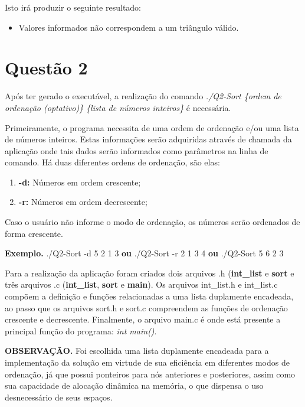  Isto irá produzir o seguinte resultado:

  \begin{itemize}
    \item Valores informados não correspondem a um triângulo válido.
  \end{itemize}

\section{Questão 2}

  Após ter gerado o executável, a realização do comando \textit{./Q2-Sort \{ordem de ordenação (optativo)\} \{lista de números
  inteiros\}} é necessária.

  Primeiramente, o programa necessita de uma ordem de ordenação e/ou uma lista de números inteiros. Estas informações
  serão adquiridas através de chamada da aplicação onde tais dados serão informados como parâmetros na linha de comando.
  Há duas diferentes ordens de ordenação, são elas:

  \begin{enumerate}
    \item \textbf{-d:} Números em ordem crescente;
    \item \textbf{-r:} Números em ordem decrescente;
  \end{enumerate}

  Caso o usuário não informe o modo de ordenação, os números serão ordenados de forma crescente.

  \textbf{Exemplo.} ./Q2-Sort -d 5 2 1 3 \textbf{ou} ./Q2-Sort -r 2 1 3 4 \textbf{ou} ./Q2-Sort 5 6 2 3

  Para a realização da aplicação foram criados dois arquivos .h (\textbf{int\_list} e \textbf{sort} e três arquivos .c
  (\textbf{int\_list}, \textbf{sort} e \textbf{main}). Os arquivos int\_list.h e int\_list.c compõem a definição e
  funções relacionadas a uma lista duplamente encadeada, ao passo que os arquivos sort.h e sort.c compreendem as funções
  de ordenação crescente e decrescente. Finalmente, o arquivo main.c é onde está presente a principal função do
  programa: \textit{int main()}.

  \textbf{OBSERVAÇÃO.} Foi escolhida uma lista duplamente encadeada para a implementação da solução em virtude de sua
  eficiência em diferentes modos de ordenação, já que possui ponteiros para nós anteriores e posteriores, assim como sua
  capacidade de alocação dinâmica na memória, o que dispensa o uso desnecessário de seus espaços.

